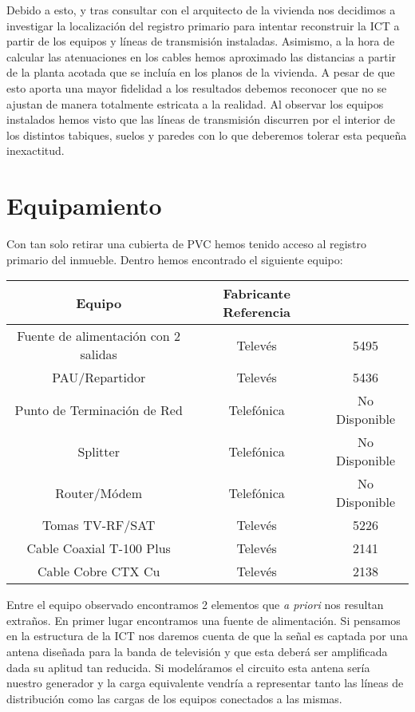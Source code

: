 \documentclass{article}[12 pt]
\begin{document}
		Debido a esto, y tras consultar con el arquitecto de la vivienda nos decidimos a investigar la localización del registro primario para intentar reconstruir la ICT a partir de los equipos y líneas de transmisión instaladas. Asimismo, a la hora de calcular las atenuaciones en los cables hemos aproximado las distancias a partir de la planta acotada que se incluía en los planos de la vivienda. A pesar de que esto aporta una mayor fidelidad a los resultados debemos reconocer que no se ajustan de manera totalmente estricata a la realidad. Al observar los equipos instalados hemos visto que las líneas de transmisión discurren por el interior de los distintos tabiques, suelos y paredes con lo que deberemos tolerar esta pequeña inexactitud.

	\section{Equipamiento}
		Con tan solo retirar una cubierta de PVC hemos tenido acceso al registro primario del inmueble. Dentro hemos encontrado el siguiente equipo:

		\begin{tabular}{| c | c | c |}
			\hline
			\textbf{Equipo} & \textbf{Fabricante} \textbf{Referencia}\\
			\hline
			Fuente de alimentación con 2 salidas & Televés & 5495\\
			\hline
			PAU/Repartidor & Televés & 5436\\
			\hline
			Punto de Terminación de Red & Telefónica & No Disponible\\
			\hline
			Splitter & Telefónica & No Disponible\\
			\hline
			Router/Módem & Telefónica & No Disponible\\
			\hline
			Tomas TV-RF/SAT & Televés & 5226\\
			\hline
			Cable Coaxial T-100 Plus  & Televés & 2141\\
			\hline
			Cable Cobre CTX Cu & Televés & 2138\\
			\hline
		\end{tabular}

		Entre el equipo observado encontramos 2 elementos que \textit{a priori} nos resultan extraños. En primer lugar encontramos una fuente de alimentación. Si pensamos en la estructura de la ICT nos daremos cuenta de que la señal es captada por una antena diseñada para la banda de televisión y que esta deberá ser amplificada dada su aplitud tan reducida. Si modeláramos el circuito esta antena sería nuestro generador y la carga equivalente vendría a representar tanto las líneas de distribución como las cargas de los equipos conectados a las mismas.\\
\end{document}
